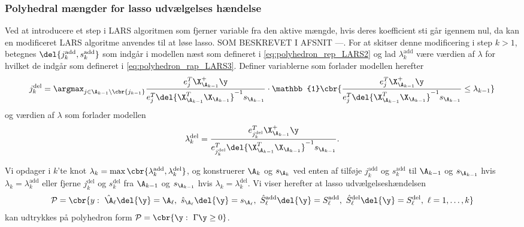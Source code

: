 \subsubsection{Polyhedral mængder for lasso udvælgelses hændelse}
Ved at introducere et step i LARS algoritmen som fjerner variable fra den aktive mængde, hvis deres koefficient sti  går igennem nul, da kan en modificeret LARS algoritme anvendes til at løse lasso. SOM BESKREVET I AFSNIT ---.
For at skitser denne modificering i step \(k>1\), betegnes \(\del{j_k^\text{add}, s_k^\text{add}}\) som indgår i modellen næst som defineret i \eqref{eq:polyhedron_rep_LARS2} og lad \(\lambda_k^\text{add}\) være værdien af \(\lambda\) for hvilket de indgår som defineret i \eqref{eq:polyhedron_rap_LARS3}.
Definer variablerne som forlader modellen herefter
\begin{align}
j_k^\text{del} = \argmax_{j \in \A_{k-1} \backslash \cbr{j_{k-1}}} \frac{e_j^T \X_{\A_{k-1}}^+ \y}{e_j^T \del{\X_{\A_{k-1}}^T \X_{\A_{k-1}}}^{-1} s_{\A_{k-1}}} \cdot \mathbb{1} \cbr{\frac{e_j^T \X_{\A_{k-1}}^+ \y}{e_j^T \del{\X_{\A_{k-1}}^T \X_{\A_{k-1}}}^{-1} s_{\A_{k-1}}} \leq \lambda_{k-1}} \label{eq:post_29}
\end{align}
og værdien af \(\lambda\) som forlader modellen
\begin{align*}
\lambda_k^\text{del} = \frac{e_{j_k^\text{del}}^T \X_{\A_{k-1}}^+ \y}{e_{j_k^\text{del}}^T \del{\X_{\A_{k-1}}^T \X_{\A_{k-1}}}^{-1} s_{\A_{k-1}}}.
\end{align*}

Vi opdager i \(k\)'te knot \(\lambda_k = \max \cbr{\lambda_k^\text{add},\lambda_k^\text{del}}\), og konstruerer \(\A_k\) og \(s_{\A_k}\) ved enten af tilføje \(j_k^\text{add}\) og \(s_k^\text{add}\) til \(\A_{k-1}\) og \(s_{\A_{k-1}}\) hvis \(\lambda_k = \lambda_k^\text{add}\) eller fjerne \(j_k^\text{del}\) og \(s_k^\text{del}\) fra \(\A_{k-1}\) og \(s_{\A_{k-1}}\)  hvis \(\lambda_k = \lambda_k^\text{del}\).
Vi viser herefter at lasso udvælgelseshændelsen
\begin{align}
\mathcal{P} = \cbr{y: \ \hat{\A}_\ell \del{\y} = \A_\ell, \ \hat{s}_{\A_\ell} \del{\y} = s_{\A_\ell}, \ \hat{S}^\text{add}_\ell \del{\y} = S^\text{add}_\ell, \ \hat{S}^\text{del}_\ell \del{\y} = S^\text{del}_\ell, \ \ell = 1, \ldots, k} \label{eq:post_31}
\end{align}
kan udtrykkes på polyhedron form \(\mathcal{P} = \cbr{\y : \ \Gamma \y \geq 0}\).

